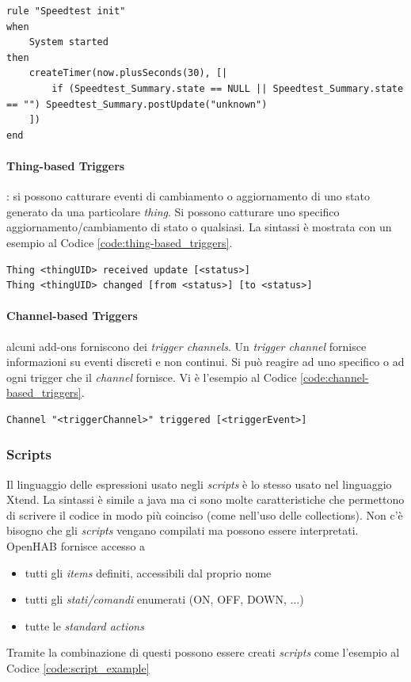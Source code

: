 \begin{lstlisting}[caption=System-based Triggers,label=code:system-based_triggers]
rule "Speedtest init"
when
    System started
then
    createTimer(now.plusSeconds(30), [|
        if (Speedtest_Summary.state == NULL || Speedtest_Summary.state == "") Speedtest_Summary.postUpdate("unknown")
    ])
end
\end{lstlisting}

\paragraph{Thing-based Triggers}: si possono catturare eventi di cambiamento o aggiornamento di uno stato generato da una particolare {\em thing}. Si possono catturare uno specifico aggiornamento/cambiamento di stato o qualsiasi. La sintassi è mostrata con un esempio al Codice \ref{code:thing-based_triggers}.

\begin{lstlisting}[caption=Thing-based Triggers,label=code:thing-based_triggers]
Thing <thingUID> received update [<status>]
Thing <thingUID> changed [from <status>] [to <status>]
\end{lstlisting}

\paragraph{Channel-based Triggers} alcuni add-ons forniscono dei {\em trigger channels}. Un {\em trigger channel} fornisce informazioni su eventi discreti e non continui. Si può reagire ad uno specifico o ad ogni trigger che il {\em channel} fornisce. Vi è l'esempio al Codice \ref{code:channel-based_triggers}.

\begin{lstlisting}[caption=Channel-based Triggers,label=code:channel-based_triggers]
Channel "<triggerChannel>" triggered [<triggerEvent>]
\end{lstlisting}

\subsubsection{Scripts}

Il linguaggio delle espressioni usato negli {\em scripts} è lo stesso usato nel linguaggio Xtend. La sintassi è simile a java ma ci sono molte caratteristiche che permettono di scrivere il codice in modo più coinciso (come nell'uso delle collections). Non c'è bisogno che gli {\em scripts} vengano compilati ma possono essere interpretati. OpenHAB fornisce accesso a 
\begin{itemize}
    \item tutti gli {\em items} definiti, accessibili dal proprio nome
    \item tutti gli {\em stati/comandi} enumerati (ON, OFF, DOWN, ...)
    \item tutte le {\em standard actions}
\end{itemize}
Tramite la combinazione di questi possono essere creati {\em scripts} come l'esempio al Codice \ref{code:script_example}

